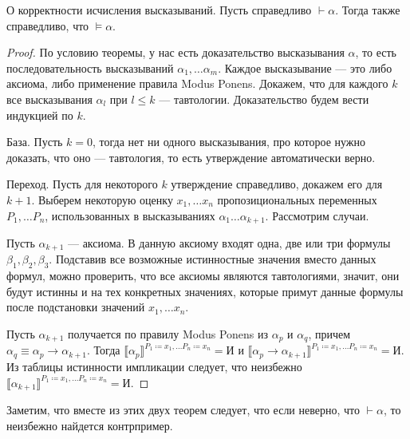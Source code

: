 \begin{theorem}{О корректности исчисления высказываний.}
Пусть справедливо $\vdash \alpha$. Тогда также справедливо, что $\models \alpha$.
\end{theorem}

\begin{proof}
По условию теоремы, у нас есть доказательство высказывания $\alpha$, то есть 
последовательность высказываний $\alpha_1, \dots \alpha_m$.
Каждое высказывание --- это либо аксиома, либо применение правила Modus Ponens.
Докажем, что для каждого $k$ все высказывания $\alpha_l$ при $l \le k$ --- тавтологии.
Доказательство будем вести индукцией по $k$.

База. Пусть $k=0$, тогда нет ни одного высказывания, про которое нужно доказать, что
оно --- тавтология, то есть утверждение автоматически верно.

Переход. Пусть для некоторого $k$ утверждение справедливо, докажем его для $k+1$.
Выберем некоторую оценку $x_1, \dots x_n$ пропозициональных 
переменных $P_1, \dots P_n$, использованных в высказываниях $\alpha_1 \dots \alpha_{k+1}$.
Рассмотрим случаи. 

Пусть $\alpha_{k+1}$ --- аксиома. В данную аксиому входят одна, две или три формулы
$\beta_1, \beta_2, \beta_3$. Подставив все возможные истинностные значения
вместо данных формул, можно проверить, что все аксиомы являются тавтологиями,
значит, они будут истинны и на тех конкретных значениях, которые примут данные формулы
после подстановки значений $x_1, \dots x_n$.

Пусть $\alpha_{k+1}$ получается по правилу Modus Ponens из $\alpha_p$ и 
$\alpha_q$, причем $\alpha_q \equiv \alpha_p \rightarrow \alpha_{k+1}$.
Тогда $\llbracket\alpha_p\rrbracket^{P_1 \coloneqq  x_1, \dots P_n\coloneqq x_n} = \texttt{И}$ и 
$\llbracket\alpha_p \rightarrow \alpha_{k+1}\rrbracket^{P_1\coloneqq x_1, \dots P_n\coloneqq x_n} = \texttt{И}$.
Из таблицы истинности импликации следует, что неизбежно 
$\llbracket\alpha_{k+1}\rrbracket^{P_1\coloneqq x_1, \dots P_n\coloneqq x_n} = \texttt{И}$.

\end{proof}

Заметим, что вместе из этих двух теорем следует, что если неверно, что $\vdash \alpha$,
то неизбежно найдется контрпример.

